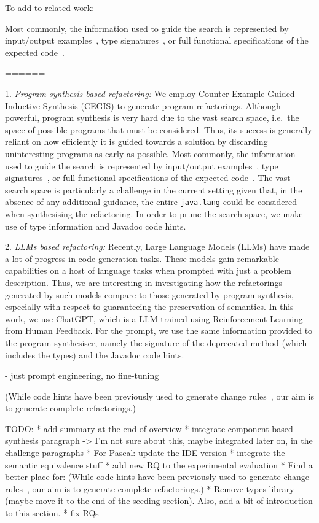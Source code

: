 To add to related work:

Most commonly, the information used to guide the search is represented by input/output examples~\cite{DBLP:conf/pldi/FeserCD15}, type signatures~\cite{DBLP:conf/pldi/OseraZ15}, or full functional specifications of the expected code~\cite{DBLP:conf/ijcai/MannaW79}.


======

1. {\em Program synthesis based refactoring:} 
We employ Counter-Example Guided Inductive Synthesis (CEGIS) to generate program refactorings. 
%
Although powerful, program synthesis is very hard due to the vast search space, i.e.~the space of possible programs that must be considered. Thus, its success is generally reliant on how efficiently it is guided towards a solution by discarding uninteresting programs as early as possible. Most commonly, the information used to guide the search is represented by input/output examples~\cite{DBLP:conf/pldi/FeserCD15}, type signatures~\cite{DBLP:conf/pldi/OseraZ15}, or full functional specifications of the expected code~\cite{DBLP:conf/ijcai/MannaW79}.
%
The vast search space is particularly a challenge in the current
setting given that, in the absence of any additional guidance, the
entire \texttt{java.lang} could be considered when synthesising the
refactoring.  In order to prune the search space, we make use of type information and Javadoc code hints.

2. {\em LLMs based refactoring:} 
Recently, Large Language Models (LLMs) have made a lot of progress in code generation tasks. 
These models gain remarkable capabilities on a host of language tasks when prompted with just a problem description.
Thus, we are interesting in investigating how the refactorings generated by such models compare to those generated by program synthesis,
especially with respect to guaranteeing the preservation of semantics. In this work, we use
ChatGPT, which is a LLM trained using Reinforcement Learning from Human Feedback.
%
For the prompt, we use the same information provided to the program synthesiser, namely the signature of the deprecated method (which includes the types) and the Javadoc code hints.

- just prompt engineering, no fine-tuning

(While code hints have been previously used to generate change rules~\cite{DBLP:conf/kbse/Huang0PW021}, our aim is to generate complete refactorings.)

TODO:
* add summary at the end of overview
* integrate component-based synthesis paragraph -> I'm not sure about this, maybe integrated later on, in the challenge paragraphs
* For Pascal: update the IDE version
* integrate the semantic equivalence stuff
* add new RQ to the experimental evaluation
* Find a better place for: (While code hints have been previously used to generate change rules~\cite{DBLP:conf/kbse/Huang0PW021}, our aim is to generate complete refactorings.)
* Remove types-library (maybe move it to the end of the seeding section). Also, add a bit of introduction to this section.
* fix RQs


